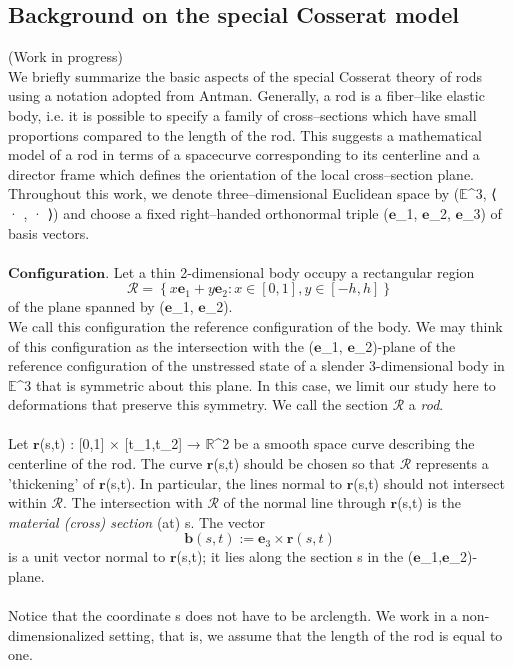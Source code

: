 \documentclass[12pt]{article}
\begin{document}
\begin{center}
\section{Background on the special Cosserat model}
(Work in progress)\\
We briefly summarize the basic aspects of the special Cosserat theory of rods using a notation adopted from Antman. Generally, a rod is a fiber–like elastic body, i.e. it is possible to specify a family of cross–sections which have small proportions compared to the length of the rod. This suggests a mathematical model of a rod in terms of a spacecurve corresponding to its centerline and a director frame which defines the orientation of the local cross–section plane.
Throughout this work, we denote three–dimensional Euclidean space by ($\mathbb{E}$^3, ⟨ · , · ⟩) and choose a fixed right–handed orthonormal triple ($\mathbf{e}$_1, $\mathbf{e}$_2, $\mathbf{e}$_3) of basis vectors.\\\\
$\mathbf{Configuration.}$ Let a thin 2-dimensional body occupy a rectangular region
\[  \mathcal{R}= \left \{
x\mathbf{e}_1 + y\mathbf{e}_2: x\in[0,1] ,y\in[-h,h] 
\right \}\]
of the plane spanned by ($\mathbf{e}$_1, $\mathbf{e}$_2).\\

We call this configuration the reference configuration of the body.
We may think of this configuration as the intersection with the ($\mathbf{e}$_1, $\mathbf{e}$_2)-plane of the reference configuration of the unstressed state of a slender 3-dimensional body in $\mathbb{E}$^3 that is symmetric about this plane. In this case, we limit our study here to deformations that preserve this symmetry. We call the section $\mathcal{R}$ a \emph{rod}.
\\\\
Let $\mathbf{r}$(s,t) : [0,1] × [t_1,t_2] → $\mathbb{R}$^2 be a smooth space curve describing the centerline of the rod.  The curve $\mathbf{r}$(s,t) should be chosen so that $\mathcal{R}$ represents a 'thickening' of $\mathbf{r}$(s,t). In particular, the lines normal to $\mathbf{r}$(s,t) should not intersect within $\mathcal{R}$. The intersection with $\mathcal{R}$ of the normal line through $\mathbf{r}$(s,t) is the \emph{material (cross) section} (at) s.  The vector 
\[ \mathbf{b}(s,t) := \mathbf{e}_3\times\mathbf{r}(s,t) \]
is a unit vector normal to $\mathbf{r}$(s,t); it lies along the section s in the ($\mathbf{e}$_1,$\mathbf{e}$_2)-plane.
\\\\
Notice that the coordinate s does not have to be arclength.
We work in a non-dimensionalized setting, that is, we assume that the length of the rod is equal to one. 


\end{center}
\end{document}
